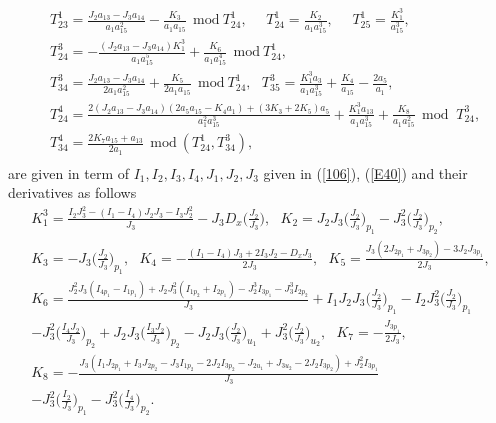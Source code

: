 \documentclass[12pt]{article}
\begin{document}
\begin{equation}
\begin{aligned}
&T^1_{23}=\frac{J_2a_{13}-J_3a_{14}}{a_1a_{15}^2}-\frac{K_3}{a_1a_{15}}~~\text{mod}~T^1_{24},
~~~~~~T^1_{24}=\frac{K_2}{a_1a_{15}^3},~~~~~~T^1_{25}=\frac{K_1^3}{a_{15}^3},\\
&T^3_{24}=-\frac{(J_2a_{13}-J_3a_{14})K_1^3}{a_1a_{15}^5}+\frac{K_6}{a_1a_{15}^4}~~\text{mod}~T^1_{24},\\
&T^3_{34}=\frac{J_2a_{13}-J_3a_{14}}{2a_1a_{15}^2}+\frac{K_5}{2a_1a_{15}}~~\text{mod}~T^1_{24},~~~T^3_{35}=\frac{K_1^3a_3}{a_1a_{15}^3}+\frac{K_4}{a_{15}}-\frac{2a_5}{a_1},\\
&T^4_{24}=\frac{2(J_2a_{13}-J_3a_{14})(2a_5a_{15}-K_4a_1)+(3K_3+2K_5)a_5}{a_1^2a_{15}^3}+\frac{K_1^3a_{13}}{a_1a_{15}^3}+\frac{K_8}{a_1a_{15}^2}
~~\text{mod }~T^3_{24},\\
&T^4_{34}=\frac{2K_7a_{15}+a_{13}}{2a_1}~~\text{mod}~(T^1_{24},T^3_{34}),\\
\end{aligned}
\end{equation}
are given in term of $I_1,I_2,I_3,I_4,J_1,J_2,J_3$ given in (\ref{106}), (\ref{E40}) and their derivatives as follows
\begin{equation}\label{E41}
\begin{aligned}
&K_1^3=\frac{I_2J_3^2-(I_1-I_4)J_2J_3-I_3J_2^2}{J_3}-J_3D_x\bigg(\frac{J_2}{J_3}\bigg),~~~K_2=J_2J_3\bigg(\frac{J_2}{J_3}\bigg)_{p_1}-J_3^2\bigg(\frac{J_2}{J_3}\bigg)_{p_2},\\
&K_3=-J_3\bigg(\frac{J_2}{J_3}\bigg)_{p_1},~~~K_4=-\frac{(I_1-I_4)J_3+2I_3J_2-D_xJ_3}{2J_3},~~~K_5=\frac{J_3(2J_{2p_1}+J_{3p_2})-3J_2J_{3p_1}}{2J_3},~~~\\
&K_6=\frac{J_2^2J_3(I_{4p_1}-I_{1p_1})+J_2J_3^2(I_{1p_2}+I_{2p_1})-J_2^3I_{3p_1}-J_3^3I_{2p_2}}{J_3}+I_1J_2J_3\bigg(\frac{J_2}{J_3}\bigg)_{p_1}-I_2J_3^2\bigg(\frac{J_2}{J_3}\bigg)_{p_1}\\
&-J_3^2\bigg(\frac{I_4J_2}{J_3}\bigg)_{p_2}+J_2J_3\bigg(\frac{I_3J_2}{J_3}\bigg)_{p_2}-J_2J_3\bigg(\frac{J_2}{J_3}\bigg)_{u_1}+J_3^2\bigg(\frac{J_2}{J_3}\bigg)_{u_2},~~~K_7=-\frac{J_{3p_1}}{2J_3},~~~\\
&K_8=-\frac{J_3(I_1J_{2p_1}+I_3J_{2p_2}-J_3I_{1p_2}-2J_2I_{3p_2}-J_{2u_1}+J_{3u_2}-2J_2I_{3p_2})+J_2^2I_{3p_1}}{J_3}\\
&-J_3^2\bigg(\frac{I_2}{J_3}\bigg)_{p_1}-J_3^2\bigg(\frac{I_4}{J_3}\bigg)_{p_2}.\\
\end{aligned}
\end{equation}
\end{document}
